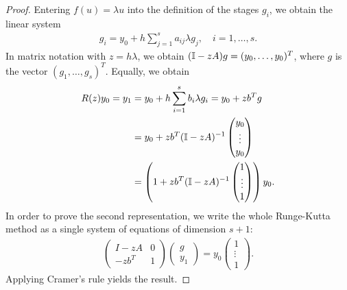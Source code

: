

\begin{proof}
  Entering $f(u) = \lambda u$ into the definition of the stages $g_i$,
  we obtain the linear system
  \begin{gather*}
    g_i = y_0 + h \sum_{j=1}^s a_{ij}\lambda g_j, \quad i=1,\dots,s.
  \end{gather*}
  In matrix notation with $z=h\lambda$, we obtain
  $(\mathbb I-z A) g = (y_0,\dots,y_0)^T$, where $g$ is the vector
  $(g_1,\dots,g_s)^T$. Equally, we obtain
  \begin{align*}
    R(z) y_0 = y_1 &= y_0 + h \sum_{i=1}^s b_i \lambda g_i = y_0 + z
    b^T g\\
    &= y_0 + z b^T(\mathbb I-z A)^{-1}
    \begin{pmatrix}
      y_0\\\vdots\\y_0
    \end{pmatrix}
    \\
    &= \left(1+z b^T(\mathbb I-z A)^{-1}
      \begin{pmatrix}
        1\\\vdots\\1
      \end{pmatrix}
    \right) y_0.
  \end{align*}
  In order to prove the second representation, we write the whole Runge-Kutta method
  as a single system of equations of dimension $s+1$:
  \begin{gather*}
    \begin{pmatrix}
      I-z A & 0 \\
      -z b^T & 1
    \end{pmatrix}
    \begin{pmatrix}
      g \\ y_1
    \end{pmatrix}
    = y_0
    \begin{pmatrix}
      1\\\vdots\\1
    \end{pmatrix}.
  \end{gather*}
  Applying Cramer's rule yields the result.
\end{proof}


